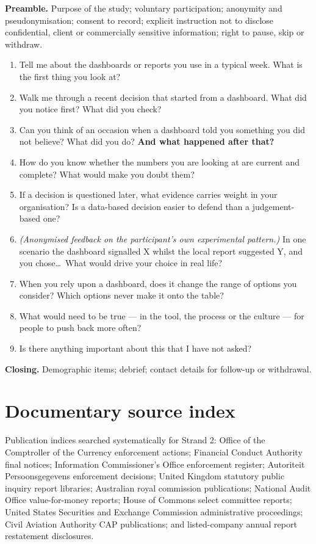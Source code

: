 \documentclass[11pt,a4paper]{article}
\numberwithin{figure}{section}
\numberwithin{table}{section}
\begin{document}
\textbf{Preamble.} Purpose of the study; voluntary participation; anonymity and pseudonymisation; consent to
record; explicit instruction not to disclose confidential, client or commercially sensitive information;
right to pause, skip or withdraw.

\begin{enumerate}[leftmargin=*,itemsep=2pt,topsep=4pt]
\item Tell me about the dashboards or reports you use in a typical week. What is the first thing you look
at?
\item Walk me through a recent decision that started from a dashboard. What did you notice first? What did
you check?
\item Can you think of an occasion when a dashboard told you something you did not believe? What did you do?
\textbf{And what happened after that?}
\item How do you know whether the numbers you are looking at are current and complete? What would make you
doubt them?
\item If a decision is questioned later, what evidence carries weight in your organisation? Is a data-based
decision easier to defend than a judgement-based one?
\item \emph{(Anonymised feedback on the participant's own experimental pattern.)} In one scenario the
dashboard signalled X whilst the local report suggested Y, and you chose\ldots\ What would drive your choice
in real life?
\item When you rely upon a dashboard, does it change the range of options you consider? Which options never
make it onto the table?
\item What would need to be true --- in the tool, the process or the culture --- for people to push back more
often?
\item Is there anything important about this that I have not asked?
\end{enumerate}

\textbf{Closing.} Demographic items; debrief; contact details for follow-up or withdrawal.

\section{Documentary source index}

Publication indices searched systematically for Strand 2: Office of the Comptroller of the Currency
enforcement actions; Financial Conduct Authority final notices; Information Commissioner's Office
enforcement register; Autoriteit Persoonsgegevens enforcement decisions; United Kingdom statutory public
inquiry report libraries; Australian royal commission publications; National Audit Office value-for-money
reports; House of Commons select committee reports; United States Securities and Exchange Commission
administrative proceedings; Civil Aviation Authority CAP publications; and listed-company annual report
restatement disclosures.
\end{document}
